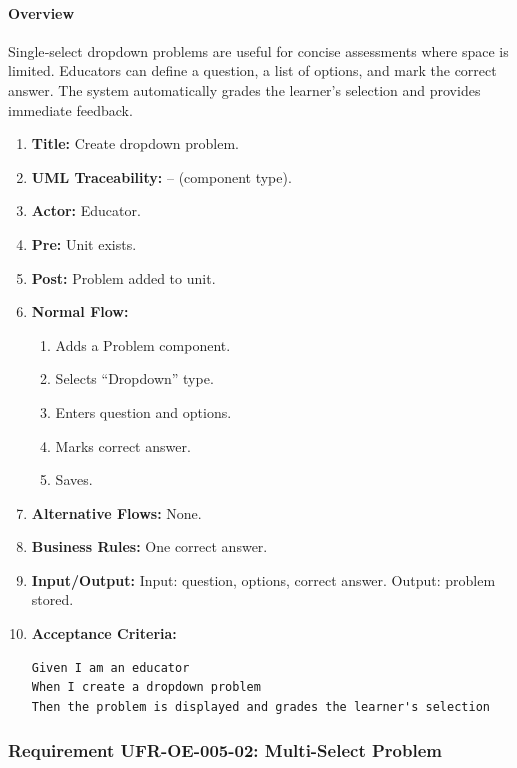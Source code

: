 \paragraph{Overview}
Single‑select dropdown problems are useful for concise assessments where space is limited. Educators can define a question, a list of options, and mark the correct answer. The system automatically grades the learner’s selection and provides immediate feedback.
\begin{enumerate}[label=\textbf{\arabic*.}]
\item \textbf{Title:} Create dropdown problem.
\item \textbf{UML Traceability:} – (component type).
\item \textbf{Actor:} Educator.
\item \textbf{Pre:} Unit exists.
\item \textbf{Post:} Problem added to unit.
\item \textbf{Normal Flow:} 
    \begin{enumerate}
        \item Adds a Problem component.
        \item Selects “Dropdown” type.
        \item Enters question and options.
        \item Marks correct answer.
        \item Saves.
    \end{enumerate}
\item \textbf{Alternative Flows:} None.
\item \textbf{Business Rules:} One correct answer.
\item \textbf{Input/Output:} Input: question, options, correct answer. Output: problem stored.
\item \textbf{Acceptance Criteria:}
    \begin{verbatim}
Given I am an educator
When I create a dropdown problem
Then the problem is displayed and grades the learner's selection
    \end{verbatim}
\end{enumerate}

\subsubsection{Requirement UFR-OE-005-02: Multi-Select Problem}
